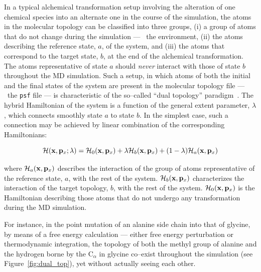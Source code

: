In a typical alchemical transformation setup involving the alteration of one
chemical species into an alternate one in the course of the simulation, the
atoms in the molecular topology can be classified into three groups, (i) a
group of atoms that do not change during the simulation --- \eg~the
environment, (ii) the atoms describing the reference state, $a$, of the
system, and (iii) the atoms that correspond to the target state, $b$, at the
end of the alchemical transformation. The atoms representative of state $a$
should \emph{never} interact with those of state $b$ throughout the MD
simulation. Such a setup, in which atoms of both the initial and the final
states of the system are present in the molecular topology file --- \ie~the
{\tt psf} file --- is characteristic of the so--called ``dual topology''
paradigm~\cite{Gao1989,Pearlman1994a,Axelsen1998}. The hybrid Hamiltonian
of the system is a function of the general extent parameter, $\lambda$,
which connects smoothly state $a$ to state $b$. In the simplest case, such a
connection may be achieved by linear combination of the corresponding Hamiltonians:

\begin{equation}
{\cal H}({\bf x}, {\bf p}_x; \lambda)
                  = {\cal H}_0({\bf x}, {\bf p}_x)
                  + \lambda {\cal H}_b({\bf x}, {\bf p}_x)
                  + (1-\lambda) {\cal H}_a({\bf x}, {\bf p}_x)
\label{linear}
\end{equation}


\noindent where ${\cal H}_a({\bf x}, {\bf p}_x)$ describes the interaction of
the group of atoms representative of the reference state, $a$, with the rest of
the system. ${\cal H}_b({\bf x}, {\bf p}_x)$ characterizes the interaction of
the target topology, $b$, with the rest of the system. ${\cal H}_0({\bf x},
{\bf p}_x)$ is the Hamiltonian describing those atoms that do not undergo any
transformation during the MD simulation.


For instance, in the point mutation of an alanine side chain into that of
glycine, by means of a free energy calculation --- either free energy
perturbation or thermodynamic integration, the topology of both the methyl
group of alanine and the hydrogen borne by the C$_\alpha$ in glycine co--exist
throughout the simulation (see Figure~\ref{fig:dual_top}), yet without actually
seeing each other.


